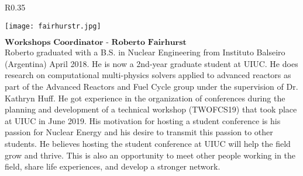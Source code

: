\setlength\intextsep{0pt}
\begin{wrapfigure}{R}{0.35\textwidth}
	\begin{center}
		\vspace{-\baselineskip}
		\texttt{[image: fairhurstr.jpg]}
	\end{center}
\end{wrapfigure}
$\textbf{Workshops Coordinator - Roberto Fairhurst}$\\
Roberto graduated with a B.S. in Nuclear Engineering from Instituto Balseiro (Argentina) April 2018. He is now a 2nd-year graduate student at UIUC. He does research on computational multi-physics solvers applied to advanced reactors as part of the Advanced Reactors and Fuel Cycle group under the supervision of Dr. Kathryn Huff. He got experience in the organization of conferences during the planning and development of a technical workshop (TWOFCS19) that took place at UIUC in June 2019. His motivation for hosting a student conference is his passion for Nuclear Energy and his desire to transmit this passion to other students. He believes hosting the student conference at UIUC will help the field grow and thrive. This is also an opportunity to meet other people working in the field, share life experiences, and develop a stronger network.


